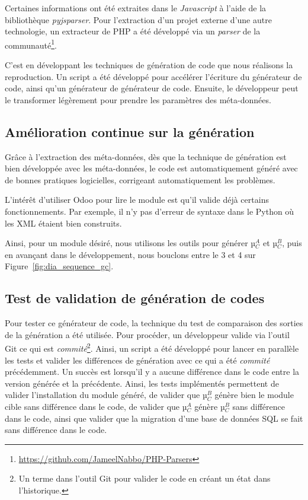 Certaines informations ont été extraites dans le \textit{Javascript} à l’aide de la bibliothèque \textit{pyjsparser}. Pour l’extraction d'un projet externe d'une autre technologie, un extracteur de PHP a été développé via un \textit{parser} de la communauté\footnote{\url{https://github.com/JameelNabbo/PHP-Parsers}}.

C'est en développant les techniques de génération de code que nous réalisons la reproduction. Un script a été développé pour accélérer l’écriture du générateur de code, ainsi qu'un générateur de générateur de code. Ensuite, le développeur peut le transformer légèrement pour prendre les paramètres des méta-données.

\subsection {Amélioration continue sur la génération}

Grâce à l’extraction des méta-données, dès que la technique de génération est bien développée avec les méta-données, le code est automatiquement généré avec de bonnes pratiques logicielles, corrigeant automatiquement les problèmes.

L’intérêt d'utiliser Odoo pour lire le module est qu'il valide déjà certains fonctionnements. Par exemple, il n'y pas d’erreur de syntaxe dans le Python où les XML étaient bien construits.

Ainsi, pour un module désiré, nous utilisons les outils pour générer µ$_C^A$ et µ$_C^B$, puis en avançant dans le développement, nous bouclons entre le 3 et 4 sur Figure~\ref{fig:dia_sequence_gc}.

\subsection {Test de validation de génération de codes}\label{test_validation_generation_code_resultat}

Pour tester ce générateur de code, la technique du test de comparaison des sorties de la génération a été utilisée. Pour procéder, un développeur valide via l'outil Git ce qui est \textit{commité}\footnote{Un terme dans l'outil Git pour valider le code en créant un état dans l'historique.}. Ainsi, un script a été développé pour lancer en parallèle les tests et valider les différences de génération avec ce qui a été \textit{commité} précédemment. Un succès est lorsqu'il y a aucune différence dans le code entre la version générée et la précédente. Ainsi, les tests implémentés permettent de valider l’installation du module généré, de valider que µ$_C^B$ génère bien le module cible sans différence dans le code, de valider que µ$_C^A$ génère µ$_C^B$ sans différence dans le code, ainsi que valider que la migration d’une base de données SQL se fait sans différence dans le code.

